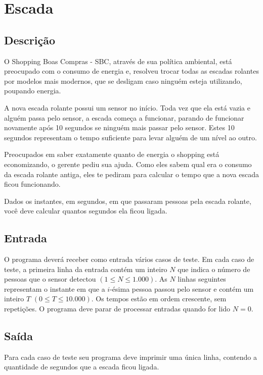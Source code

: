 \section{Escada}

\subsection{Descri\c{c}\~ao} 
O Shopping Boas Compras - SBC, atrav\'es de sua pol\'itica ambiental, est\'a preocupado com o consumo de energia e, resolveu trocar todas as escadas rolantes por modelos mais modernos, que se desligam caso ningu\'em esteja utilizando, poupando energia.

A nova escada rolante possui um sensor no in\'icio. Toda vez que ela est\'a vazia e algu\'em passa pelo sensor, a escada come\c{c}a a funcionar, parando de funcionar novamente ap\'os 10 segundos se ningu\'em mais passar pelo sensor. Estes 10 segundos representam o tempo suficiente para levar algu\'em de um n\'ivel ao outro.

Preocupados em saber exatamente quanto de energia o shopping est\'a economizando, o gerente pediu sua ajuda. Como eles sabem qual era o consumo da escada rolante antiga, eles te pediram para calcular o tempo que a nova escada ficou funcionando. 

Dados os instantes, em segundos, em que passaram pessoas pela escada rolante, voc\^e deve calcular quantos segundos ela ficou ligada. 

\subsection{Entrada}

O programa dever\'a receber como entrada v\'arios casos de teste. Em cada caso de teste, a primeira linha da entrada cont\'em um inteiro $N$ que indica o n\'umero de pessoas que o sensor detectou $(1 \leq N \leq 1.000)$. As $N$ linhas seguintes representam o instante em que a $i$-\'esima pessoa passou pelo sensor e cont\'em um inteiro $T$ $(0 \leq T \leq 10.000)$. Os tempos est\~ao em ordem crescente, sem repeti\c{c}\~oes. O programa deve parar de processar entradas quando for lido $N = 0$.

\subsection{Sa\'ida}

Para cada caso de teste seu programa deve imprimir uma \'unica linha, contendo a quantidade de segundos que a escada ficou ligada.

